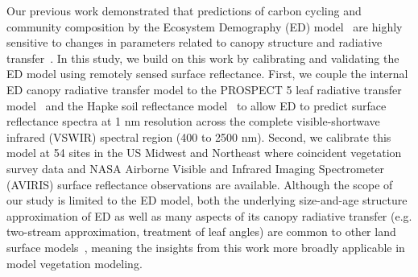 Our previous work demonstrated that predictions of carbon cycling and community composition by the Ecosystem Demography (ED) model~\citep{medvigy2009mechanistic} are highly sensitive to changes in parameters related to canopy structure and radiative transfer~\citep{viskari_2019_influence}.
In this study, we build on this work by calibrating and validating the ED model using remotely sensed surface reflectance.
First, we couple the internal ED canopy radiative transfer model to the PROSPECT 5 leaf radiative transfer model~\citep{feret2008prospect4} and the Hapke soil reflectance model~\citep{verhoef2007coupled} to allow ED to predict surface reflectance spectra at 1 \unit{nm} resolution across the complete visible-shortwave infrared (VSWIR) spectral region (400 to 2500 nm).
Second, we calibrate this model at 54 sites in the US Midwest and Northeast where coincident vegetation survey data and NASA Airborne Visible and Infrared Imaging Spectrometer (AVIRIS) surface reflectance observations are available.
Although the scope of our study is limited to the ED model, both the underlying size-and-age structure approximation of ED as well as many aspects of its canopy radiative transfer (e.g. two-stream approximation, treatment of leaf angles) are common to other land surface models~\citep[e.g., FATES]{koven2020benchmarking}, meaning the insights from this work more broadly applicable in model vegetation modeling.
